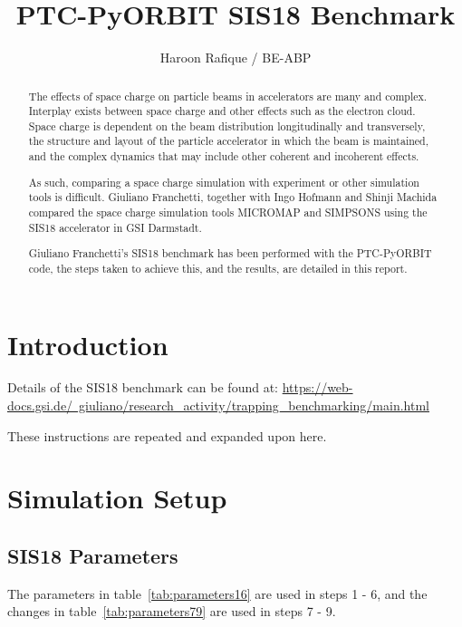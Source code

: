 \documentclass[a4paper]{cernatsnote}
\title{PTC-PyORBIT SIS18 Benchmark}
\author{Haroon Rafique / BE-ABP}
\def \gsiSISpage {\href{https://web-docs.gsi.de/~giuliano/research_activity/trapping_benchmarking/main.html}{https://web-docs.gsi.de/~giuliano/research\_activity/trapping\_benchmarking/main.html}}
\begin{document}
	
\maketitle %

\begin{abstract}
	The effects of space charge on particle beams in accelerators are many and complex. Interplay exists between space charge and other effects such as the electron cloud. Space charge is dependent on the beam distribution longitudinally and transversely, the structure and layout of the particle accelerator in which the beam is maintained, and the complex dynamics that may include other coherent and incoherent effects.
	
	As such, comparing a space charge simulation with experiment or other simulation tools is difficult. Giuliano Franchetti, together with Ingo Hofmann and Shinji Machida compared the space charge simulation tools MICROMAP and SIMPSONS using the SIS18 accelerator in GSI Darmstadt. 	
	
	Giuliano Franchetti's SIS18 benchmark has been performed with the PTC-PyORBIT code, the steps taken to achieve this, and the results, are detailed in this report.
\end{abstract}

\section{Introduction}
\label{sec:intro}

Details of the SIS18 benchmark can be found at:
\gsiSISpage

These instructions are repeated and expanded upon here. 
	
\section{Simulation Setup}

\subsection{SIS18 Parameters}
The parameters in table~\ref{tab:parameters16} are used in steps 1 - 6, and the changes in table~\ref{tab:parameters79} are used in steps 7 - 9.
\end{document}
